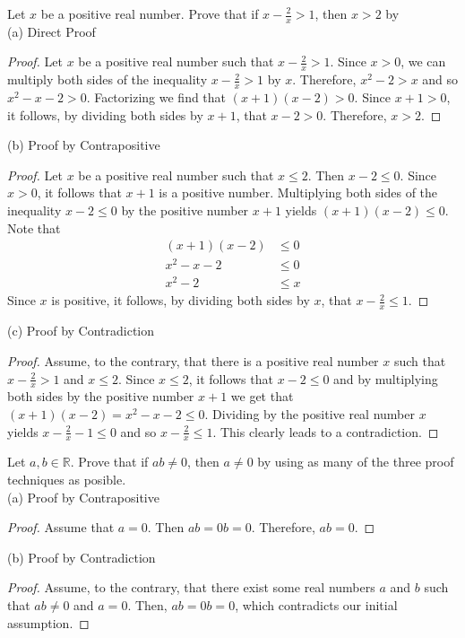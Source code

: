 \documentclass[12pt]{article}
\newcommand{\R}{\mathbb{R}}
\newenvironment{problem}[2][Problem]{\begin{trivlist}
		\item[\hskip \labelsep {\bfseries #1}\hskip \labelsep {\bfseries #2.}]}{\end{trivlist}}
\begin{document}
	\begin{problem}{35}
		Let $x$ be a positive real number. Prove that if $x-\frac{2}{x}>1$, then $x>2$ by\\
		
		(a) Direct Proof
		\begin{proof}
			Let $x$ be a positive real number such that $x-\frac{2}{x}>1$. Since $x>0$, we can multiply both sides of the inequality $x-\frac{2}{x}>1$ by $x$. Therefore, $x^{2} -2 >x$ and so $x^{2}-x-2>0$. Factorizing we find that $(x+1)(x-2)>0$. Since $x+1>0$, it follows, by dividing both sides by $x+1$, that  $x-2>0$. Therefore, $x>2$.
		\end{proof} 
	
		(b) Proof by Contrapositive
		\begin{proof}
			Let $x$ be a positive real number such that $x\leq 2$. Then $x-2\leq 0$. Since $x>0$, it follows that $x+1$ is a positive number. Multiplying both sides of the inequality $x-2 \leq 0$ by the positive number $x+1$ yields $(x+1)(x-2)\leq 0$. Note that
			\begin{align*}
				(x+1)(x-2)&\leq 0\\
				x^{2} -x -2 &\leq 0\\
				x^{2}-2 &\leq x
			\end{align*}
		Since $x$ is positive, it follows, by dividing both sides by $x$, that $x - \frac{2}{x} \leq 1$.
		\end{proof}
	
		(c) Proof by Contradiction
		\begin{proof}
			Assume, to the contrary, that there is a positive real number $x$ such that $x-\frac{2}{x}>1$ and $x\leq 2$. Since $x\leq 2$, it follows that $x-2\leq 0$ and by multiplying both sides by the positive number $x+1$ we get that $(x+1)(x-2) = x^{2} -x-2\leq 0$. Dividing by the positive real number $x$ yields $x-\frac{2}{x} -1\leq 0$ and so $x-\frac{2}{x}\leq 1$. This clearly leads to a contradiction.
		\end{proof}
	\end{problem}

	\begin{problem}{36}
		Let $a,b\in \R$. Prove that if $ab\neq 0$, then $a\neq 0$ by using as many of the three proof techniques as posible.\\
		
		(a) Proof by Contrapositive
		\begin{proof}
			Assume that $a = 0$. Then $ab = 0b = 0$. Therefore, $ab = 0$.
		\end{proof}
	
		(b) Proof by Contradiction
		\begin{proof}
			Assume, to the contrary, that there exist some real numbers $a$ and $b$ such that $ab\neq 0$ and $a=0$. Then, $ab = 0b = 0$, which contradicts our initial assumption.
		\end{proof}
	\end{problem}
\end{document}
